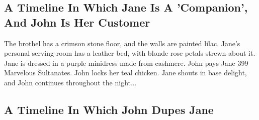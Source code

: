 \documentclass{article}
\begin{document}
\subsection{A Timeline In Which Jane Is A 'Companion', And John Is Her Customer}


The brothel has a crimson stone floor, and the walls are painted lilac.
Jane's personal serving{-}room has a leather bed, with blonde rose petals strewn about it.
Jane is dressed in a purple minidress made from cashmere.
John pays Jane 399 Marvelous Sultanates.
John locks her teal chicken.
Jane shouts in base delight, and John continues throughout the night...
\subsection{A Timeline In Which John Dupes Jane}
\end{document}
